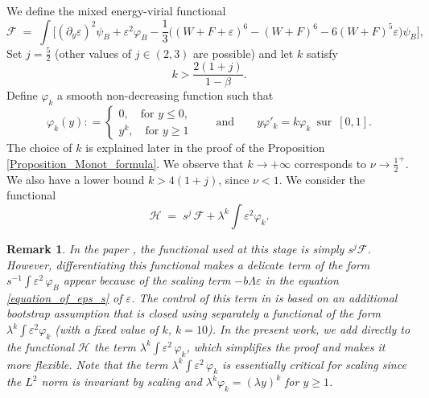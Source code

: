 \documentclass[16pt,english, oneside,reqno]{smfart}
\newcommand{\vare}{{\varepsilon}}
\newcommand{\vphi}{{\varphi}}
\newtheorem{remark}{Remark}[section]
\begin{document}
We define the mixed energy-virial functional 
    \begin{equation*}
        \mathcal{F} \;=\; \int \Big[ (\partial_y \vare )^2 \psi_B + \vare^2 \varphi_B - \frac{1}{3}\Big( (W+F+\vare)^6-(W+F)^6-6(W+F)^5\vare \Big) \psi_B \Big],
    \end{equation*}
Set $j = \frac 52$ (other values of $j \in (2,3)$ are possible) and let $k$ satisfy
\begin{equation}\label{choice-of-k}
    k > \frac{2(1+j)}{1-\beta}.
\end{equation}
Define $\vphi_k$ a smooth non-decreasing function such that
\begin{equation*}
    \vphi_k(y)  : =\begin{cases}
        0,  \quad \text{for  } y\leq0,\\
        y^k,  \quad \text{for  } y \geq 1
    \end{cases} \qquad \text{and} \qquad y\vphi'_k = k\vphi_k \,\text{ sur } \, [0,1].
\end{equation*}
The choice of $k$ is explained later in the proof of the Proposition \ref{Proposition_Monot_formula}. We observe that $k\to +\infty$ corresponds to $\nu \to \frac 12^+$. We also have a lower bound $k > 4(1+j)$, since $\nu < 1$. %
We consider the functional
\begin{equation*}
        \mathcal{H} \;=\; s^j \, \mathcal{F} + \lambda^k \int \vare^2 \varphi_k.
    \end{equation*}
\begin{remark}
In the paper \cite{MMPIII}, the functional used at this stage is simply $s^{j}\mathcal{F}$.
However, differentiating this functional makes a delicate term of the form
$s^{-1}\int \vare^2\,\vphi_B$
appear because of the scaling term $-b \Lambda \vare$ in the equation \eqref{equation_of_eps_s}
of $\vare$.
The control of this term in \cite{MMPIII} is based on an additional bootstrap assumption that
is closed using separately a functional of the form $\lambda^k \int \vare^2 \varphi_k$
(with a fixed value of $k$, $k=10$).
In the present work, we add directly to the functional $\mathcal{H}$ the term $\lambda^{k}\int \vare^2\,\vphi_k$, which simplifies the proof and makes it more flexible.
Note that the term $\lambda^{k}\int \vare^2\,\vphi_k$ is essentially critical for scaling
since the $L^2$ norm is invariant by scaling and $\lambda^k \varphi_k = (\lambda y) ^k$
for $y\geq 1$.
\end{remark}
\end{document}
